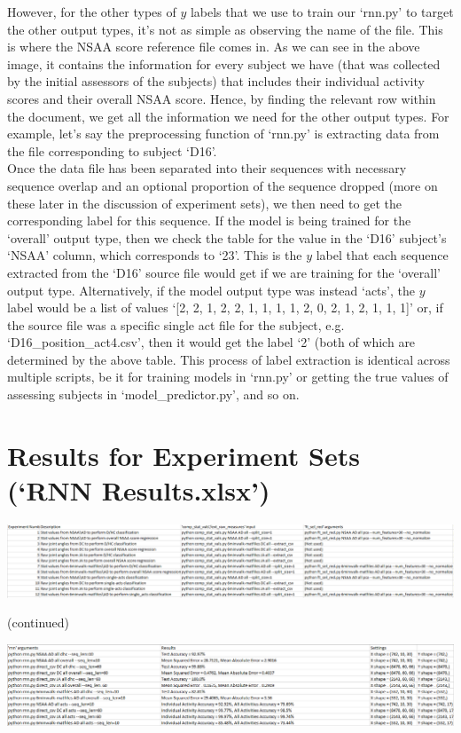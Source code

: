 \documentclass[12pt,twoside]{report}
\begin{document}
\quad However, for the other types of $y$ labels that we use to train our ‘rnn.py’ to target the other output types, it’s not as simple as observing the name of the file. This is where the NSAA score reference file comes in. As we can see in the above image, it contains the information for every subject we have (that was collected by the initial assessors of the subjects) that includes their individual activity scores and their overall NSAA score. Hence, by finding the relevant row within the document, we get all the information we need for the other output types. For example, let’s say the preprocessing function of ‘rnn.py’ is extracting data from the file corresponding to subject ‘D16’.\\

\quad Once the data file has been separated into their sequences with necessary sequence overlap and an optional proportion of the sequence dropped (more on these later in the discussion of experiment sets), we then need to get the corresponding label for this sequence. If the model is being trained for the ‘overall’ output type, then we check the table for the value in the ‘D16’ subject’s ‘NSAA’ column, which corresponds to ‘23’. This is the $y$ label that each sequence extracted from the ‘D16’ source file would get if we are training for the ‘overall’ output type. Alternatively, if the model output type was instead ‘acts’, the $y$ label would be a list of values ‘[2, 2, 1, 2, 2, 1, 1, 1, 1, 2, 0, 2, 1, 2, 1, 1, 1]’ or, if the source file was a specific single act file for the subject, e.g. ‘D16\_position\_act4.csv’, then it would get the label ‘2’ (both of which are determined by the above table. This process of label extraction is identical across multiple scripts, be it for training models in ‘rnn.py’ or getting the true values of assessing subjects in ‘model\_predictor.py’, and so on.


\section{Results for Experiment Sets (‘RNN Results.xlsx’)}

\begin{center}
\includegraphics[scale=0.35]{project_figures/fig7_3}
\end{center}
\begin{center}
(continued)
\end{center}
\begin{center}
\includegraphics[scale=0.35]{project_figures/fig7_4}
\end{center}
\end{document}
